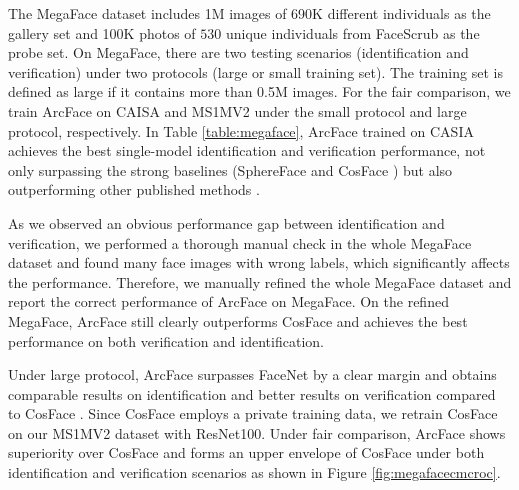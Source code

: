 \documentclass[10pt,twocolumn,letterpaper]{article}
\begin{document}
 The MegaFace dataset \cite{kemelmacher2016megaface} includes 1M images of 690K different individuals  as the gallery set and 100K photos of $530$ unique individuals from FaceScrub \cite{ng2014data} as the probe set. On MegaFace, there are two testing scenarios (identification and verification) under two protocols (large or small training set). The training set is defined as large if it contains more than 0.5M images. For the fair comparison, we train ArcFace on CAISA and MS1MV2 under the small protocol and large protocol, respectively. In Table \ref{table:megaface}, ArcFace trained on CASIA achieves the best single-model identification and verification performance, not only surpassing the strong baselines (\eg SphereFace \cite{liu2017sphereface} and CosFace \cite{tencent2017CosineFace}) but also outperforming other published methods \cite{wen2016discriminative,liu2018learning}.  

As we observed an obvious performance gap between identification and verification, we performed a thorough manual check in the whole MegaFace dataset and found many face images with wrong labels, which significantly affects the performance. Therefore, we manually refined the whole MegaFace dataset and report the correct performance of ArcFace on MegaFace. On the refined MegaFace, ArcFace still clearly outperforms CosFace and achieves the best performance on both verification and identification.

Under large protocol, ArcFace surpasses FaceNet \cite{schroff2015facenet} by a clear margin and obtains comparable results on identification and better results on verification compared to CosFace \cite{tencent2017CosineFace}. Since CosFace employs a private training data, we retrain CosFace on our MS1MV2 dataset with ResNet100. Under fair comparison, ArcFace shows superiority over CosFace  and forms an upper envelope of CosFace under both identification and verification scenarios as shown in Figure \ref{fig:megafacecmcroc}.
\end{document}

